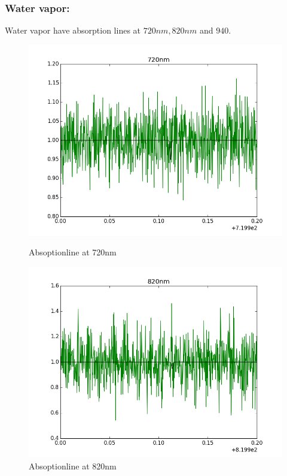 \documentclass[a4paper,11pt,english]{report}
\begin{document}
\subsubsection{Water vapor:} Water vapor have absorption lines at \(720nm,820nm\)
and \(940\).  
\begin{figure}[!htb]
  \includegraphics[scale =0.33]{720nm.png}
  \caption{Absoptionline at 720nm}
  \endminipage\hfill
  \includegraphics[scale = 0.33]{820nm.png}
  \caption{Absoptionline at 820nm}
  \endminipage\hfill

\end{figure}
\end{document}
